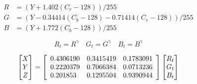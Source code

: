 \begin{align}
R& = (Y + 1.402 (C_r - 128) \label{e:ycbcr-rgb-first}) / 255 \\
G& = (Y - 0.34414 (C_b - 128) - 0.71414 (C_r - 128)) / 255 \\
B& = (Y + 1.772 (C_b - 128)) / 255\label{e:ycbcr-rgb-last}
\end{align}

\begin{equation}
R_t = R^\gamma \quad G_t = G^\gamma \quad B_t = B^\gamma
\label{e:secam-rgb-xyz-first}
\end{equation}

\begin{equation}
\begin{bmatrix}
  X \\ Y \\ Z
\end{bmatrix}
= \left[
\setlength{\arraycolsep}{5pt} \sisetup{group-digits = false}
\begin{array}{S[table-format=1.7]S[table-format=1.7]S[table-format=1.7]}
 0.4306190 & 0.3415419 & 0.1783091 \\
 0.2220379 & 0.7066384 & 0.0713236 \\
 0.201853  &  0.1295504 & 0.9390944
\end{array}\right]
\begin{bmatrix}
  R_t \\ G_t \\ B_t
\end{bmatrix}
\label{e:secam-rgb-xyz-last}
\end{equation}